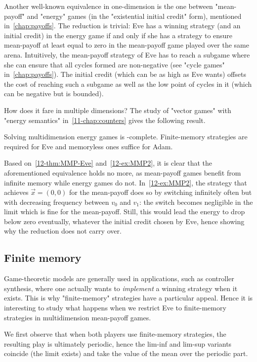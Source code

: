Another well-known equivalence in one-dimension is the one between "mean-payoff" and "energy" games (in the "existential initial credit" form), mentioned in~\cref{chap:payoffs}. The reduction is trivial: Eve has a winning strategy (and an initial credit) in the energy game if and only if she has a strategy to ensure mean-payoff at least equal to zero in the mean-payoff game played over the same arena. Intuitively, the mean-payoff strategy of Eve has to reach a subgame where she can ensure that all cycles formed are non-negative (see "cycle games" in~\cref{chap:payoffs}). The initial credit (which can be as high as Eve wants) offsets the cost of reaching such a subgame as well as the low point of cycles in it (which can be negative but is bounded).

How does it fare in multiple dimensions? The study of "vector games" with "energy semantics" in~\cref{11-chap:counters} gives the following result.

\begin{theorem}
\label{12-thm:MEG}
Solving multidimension energy games is \coNP-complete. Finite\--mem\-ory strategies are required for Eve and memoryless ones suffice for Adam.
\end{theorem} 

Based on~\cref{12-thm:MMP-Eve} and~\cref{12-ex:MMP2}, it is clear that the aforementioned equivalence holds no more, as mean-payoff games benefit from infinite memory while energy games do not. In~\cref{12-ex:MMP2}, the strategy that achieves $\vec{x} = (0, 0)$ for the mean-payoff does so by switching infinitely often but with decreasing frequency between $v_0$ and $v_1$: the switch becomes negligible in the limit which is fine for the mean-payoff. Still, this would lead the energy to drop below zero eventually, whatever the initial credit chosen by Eve, hence showing why the reduction does not carry over.


\subsection{Finite memory}

Game-theoretic models are generally used in applications, such as controller synthesis, where one actually wants to \textit{implement} a winning strategy when it exists. This is why "finite-memory" strategies have a particular appeal. Hence it is interesting to study what happens when we restrict Eve to finite-memory strategies in multidimension mean-payoff games. 

We first observe that when both players use finite-memory strategies, the resulting play is ultimately periodic, hence the lim-inf and lim-sup variants coincide (the limit exists) and take the value of the mean over the periodic part.

